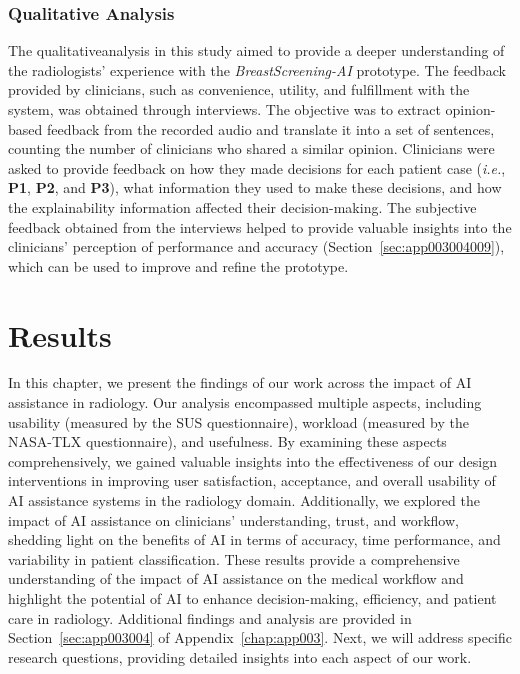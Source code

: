 \subsubsection{Qualitative Analysis}
\label{sec:chap005005004002}

The qualitative\footnotemark[14] analysis in this study aimed to provide a deeper understanding of the radiologists' experience with the {\it BreastScreening-AI} prototype.
The feedback provided by clinicians, such as convenience, utility, and fulfillment with the system, was obtained through interviews.
The objective was to extract opinion-based feedback from the recorded audio and translate it into a set of sentences, counting the number of clinicians who shared a similar opinion.
Clinicians were asked to provide feedback on how they made decisions for each patient case ({\it i.e.}, {\bf P1}, {\bf P2}, and {\bf P3}), what information they used to make these decisions, and how the explainability information affected their decision-making.
The subjective feedback obtained from the interviews helped to provide valuable insights into the clinicians' perception of performance and accuracy (Section~\ref{sec:app003004009}), which can be used to improve and refine the prototype.


\section{Results}
\label{sec:chap005006}

In this chapter, we present the findings of our work across the impact of \ac{AI} assistance in radiology.
Our analysis encompassed multiple aspects, including usability (measured by the \ac{SUS} questionnaire), workload (measured by the \ac{NASA-TLX} questionnaire), and usefulness.
By examining these aspects comprehensively, we gained valuable insights into the effectiveness of our design interventions in improving user satisfaction, acceptance, and overall usability of \ac{AI} assistance systems in the radiology domain.
Additionally, we explored the impact of \ac{AI} assistance on clinicians' understanding, trust, and workflow, shedding light on the benefits of \ac{AI} in terms of accuracy, time performance, and variability in patient classification.
These results provide a comprehensive understanding of the impact of \ac{AI} assistance on the medical workflow and highlight the potential of \ac{AI} to enhance decision-making, efficiency, and patient care in radiology.
Additional findings and analysis are provided in Section~\ref{sec:app003004} of Appendix~\ref{chap:app003}.
Next, we will address specific research questions, providing detailed insights into each aspect of our work.

